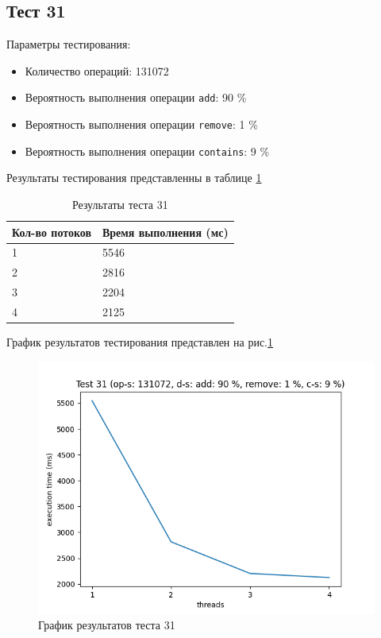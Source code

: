 \subsection*{Тест 31}

Параметры тестирования:

\begin{itemize}
    \item Количество операций: 131072
    \item Вероятность выполнения операции \verb|add|: 90 \%
    \item Вероятность выполнения операции \verb|remove|: 1 \%
    \item Вероятность выполнения операции \verb|contains|: 9 \%
\end{itemize}

Результаты тестирования представленны в таблице \ref{tab:results31}


\begin{table}[H]
    \centering
    \begin{tabular}{|l|l|}
        \hline
        Кол-во потоков & Время выполнения (мс) \\
        \hline
        1 & 5546 \\
        \hline
        2 & 2816 \\
        \hline
        3 & 2204 \\
        \hline
        4 & 2125 \\
        \hline
    \end{tabular}
    \caption{Результаты теста 31}
    \label{tab:results31}
\end{table}
        

График результатов тестирования представлен на рис.\ref{fig:plot31}

\begin{figure}[H]
    \centering
    \includegraphics[width=0.7\linewidth]{photo/plot31}
    \caption{График результатов теста 31}
    \label{fig:plot31}
\end{figure}

